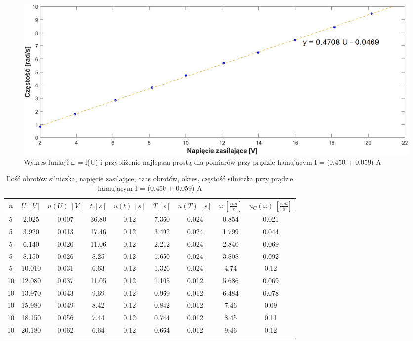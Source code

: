 \documentclass[12pt, a4paper, oneside]{article}
\begin{document}
\begin{figure}[h]
\centering
\clearpage
\caption{Wykres funkcji $\omega$ = f(U) i przybliżenie najlepszą prostą dla pomiarów przy prądzie hamującym I = (0.450 $\pm$ 0.059) A}
\includegraphics[scale=0.3]{f5.png}
\end{figure}
\begin{table}[h]
  \centering
  \caption{Ilość obrotów silniczka, napięcie zasilające, czas obrotów, okres, częstość silniczka przy prądzie hamującym I = (0.450 $\pm$ 0.059) A}
    \begin{tabular}{|c|c|c|c|c|c|c|c|c|}\hline
    $n$ & $U~[V]$ & $u(U)~[V]$ & $t~[s]$ & $u(t)~[s]$ & $T~[s]$ & $u(T)~[s]$ & $\omega~[\frac{rad}{s}]$ & $u_C(\omega)~[\frac{rad}{s}]$ \\\hline
    5 & 2.025 & 0.007 & 36.80 & 0.12 & 7.360 & 0.024 & 0.854 & 0.021 \\\hline
    5 & 3.920 & 0.013 & 17.46 & 0.12 & 3.492 & 0.024 & 1.799 & 0.044 \\\hline
    5 & 6.140 & 0.020 & 11.06 & 0.12 & 2.212 & 0.024 & 2.840 & 0.069 \\\hline
    5 & 8.150 & 0.026 & 8.25 & 0.12 & 1.650 & 0.024 & 3.808 & 0.092 \\\hline
    5 & 10.010 & 0.031 & 6.63 & 0.12 & 1.326 & 0.024 & 4.74 & 0.12 \\\hline
    10 & 12.080 & 0.037 & 11.05 & 0.12 & 1.105 & 0.012 & 5.686 & 0.069 \\\hline
    10 & 13.970 & 0.043 & 9.69 & 0.12 & 0.969 & 0.012 & 6.484 & 0.078 \\\hline
    10 & 15.980 & 0.049 & 8.42 & 0.12 & 0.842 & 0.012 & 7.46 & 0.09 \\\hline
    10 & 18.150 & 0.056 & 7.44 & 0.12 & 0.744 & 0.012 & 8.45 & 0.11 \\\hline
    10 & 20.180 & 0.062 & 6.64 & 0.12 & 0.664 & 0.012 & 9.46 & 0.12 \\\hline
    \end{tabular}%
  \label{tab:addlabel}%
\end{table}%
\end{document}

